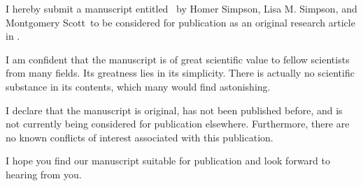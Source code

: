 \documentclass{config/mycoverletter}
\newcommand*{\authors}{Homer Simpson, Lisa M. Simpson, and Montgomery Scott}
\begin{document}
I hereby submit a manuscript entitled \papertitle\ by \authors\ to be considered for publication as an original research article in \journaltitle.

I am confident that the manuscript is of great scientific value to fellow scientists from many fields. Its greatness lies in its simplicity. There is actually no scientific substance in its contents, which many would find astonishing.

I declare that the manuscript is original, has not been published before, and is not currently being considered for publication elsewhere. Furthermore, there are no known conflicts of interest associated with this publication.

I hope you find our manuscript suitable for publication and look forward to hearing from you.
\end{document}
